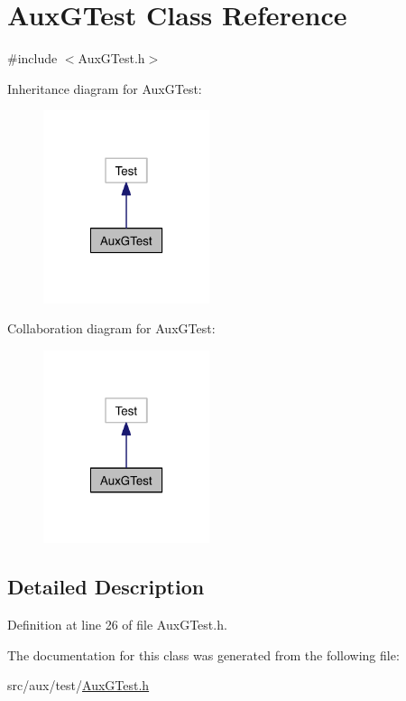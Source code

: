 \hypertarget{class_aux_g_test}{\section{Aux\-G\-Test Class Reference}
\label{class_aux_g_test}
}


{\ttfamily \#include $<$Aux\-G\-Test.\-h$>$}



Inheritance diagram for Aux\-G\-Test\-:\nopagebreak
\begin{figure}[H]
\begin{center}
\leavevmode
\includegraphics[width=138pt]{class_aux_g_test__inherit__graph}
\end{center}
\end{figure}


Collaboration diagram for Aux\-G\-Test\-:\nopagebreak
\begin{figure}[H]
\begin{center}
\leavevmode
\includegraphics[width=138pt]{class_aux_g_test__coll__graph}
\end{center}
\end{figure}


\subsection{Detailed Description}


Definition at line 26 of file Aux\-G\-Test.\-h.



The documentation for this class was generated from the following file\-:\begin{DoxyCompactItemize}
\item 
src/aux/test/\hyperlink{_aux_g_test_8h}{Aux\-G\-Test.\-h}\end{DoxyCompactItemize}
